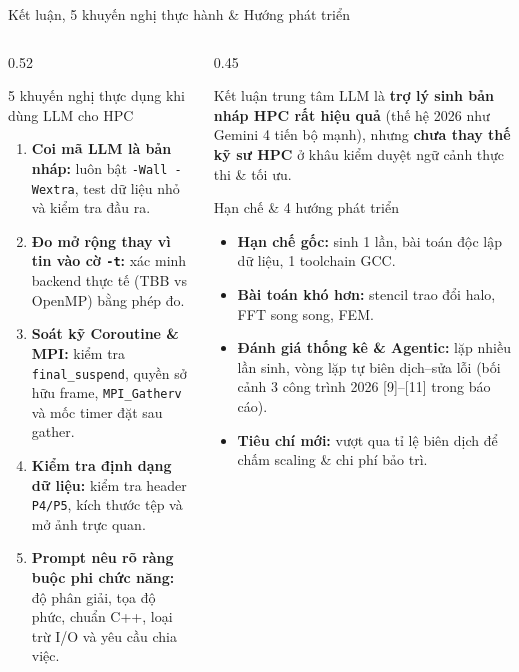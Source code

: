 \documentclass[aspectratio=169,10pt]{beamer}
\newcommand{\code}[1]{\texttt{\color{BlueDark}#1}}
\begin{document}
\begin{frame}{Kết luận, 5 khuyến nghị thực hành \& Hướng phát triển}
\begin{columns}[T,totalwidth=\textwidth]
  \begin{column}{0.52\textwidth}
    \begin{bluebox}[height=5.90cm]{5 khuyến nghị thực dụng khi dùng LLM cho HPC}
      \begin{enumerate}\scriptsize\setlength{\itemsep}{4pt}
        \item \textbf{Coi mã LLM là bản nháp:} luôn bật \code{-Wall -Wextra}, test dữ liệu nhỏ và kiểm tra đầu ra.
        \item \textbf{Đo mở rộng thay vì tin vào cờ \code{-t}:} xác minh backend thực tế (TBB vs OpenMP) bằng phép đo.
        \item \textbf{Soát kỹ Coroutine \& MPI:} kiểm tra \code{final\_suspend}, quyền sở hữu frame, \code{MPI\_Gatherv} và mốc timer đặt sau gather.
        \item \textbf{Kiểm tra định dạng dữ liệu:} kiểm tra header \code{P4/P5}, kích thước tệp và mở ảnh trực quan.
        \item \textbf{Prompt nêu rõ ràng buộc phi chức năng:} độ phân giải, tọa độ phức, chuẩn C++, loại trừ I/O và yêu cầu chia việc.
      \end{enumerate}
    \end{bluebox}
  \end{column}
  \begin{column}{0.45\textwidth}
    \begin{hboxcard}[height=1.95cm]{Kết luận trung tâm}
      \scriptsize LLM là \textbf{trợ lý sinh bản nháp HPC rất hiệu quả} (thế hệ 2026 như Gemini 4 tiến bộ mạnh), nhưng \textbf{chưa thay thế kỹ sư HPC} ở khâu kiểm duyệt ngữ cảnh thực thi \& tối ưu.
    \end{hboxcard}
    \vspace{0.20cm}
    \begin{bluebox}[height=3.75cm]{Hạn chế \& 4 hướng phát triển}
      \begin{itemize}\scriptsize\setlength{\itemsep}{2pt}
        \item \textbf{Hạn chế gốc:} sinh 1 lần, bài toán độc lập dữ liệu, 1 toolchain GCC.
        \item \textbf{Bài toán khó hơn:} stencil trao đổi halo, FFT song song, FEM.
        \item \textbf{Đánh giá thống kê \& Agentic:} lặp nhiều lần sinh, vòng lặp tự biên dịch--sửa lỗi (bối cảnh 3 công trình 2026 [9]--[11] trong báo cáo).
        \item \textbf{Tiêu chí mới:} vượt qua tỉ lệ biên dịch để chấm scaling \& chi phí bảo trì.
      \end{itemize}
    \end{bluebox}
  \end{column}
\end{columns}
\end{frame}
\end{document}
